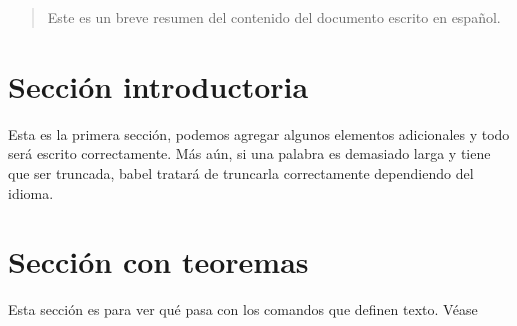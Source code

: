 \documentclass{article}
\begin{document}
 
\tableofcontents
 
\vspace{2cm} %
 
\begin{abstract}
Este es un breve resumen del contenido del 
documento escrito en español.
\end{abstract}
 
\section{Sección introductoria}
Esta es la primera sección, podemos agregar 
algunos elementos adicionales y todo será 
escrito correctamente. Más aún, si una palabra 
es demasiado larga y tiene que ser truncada, 
babel tratará de truncarla correctamente 
dependiendo del idioma.
 
\section{Sección con teoremas}
Esta sección es para ver qué pasa con los comandos 
que definen texto.
Véase


 
\end{document}
